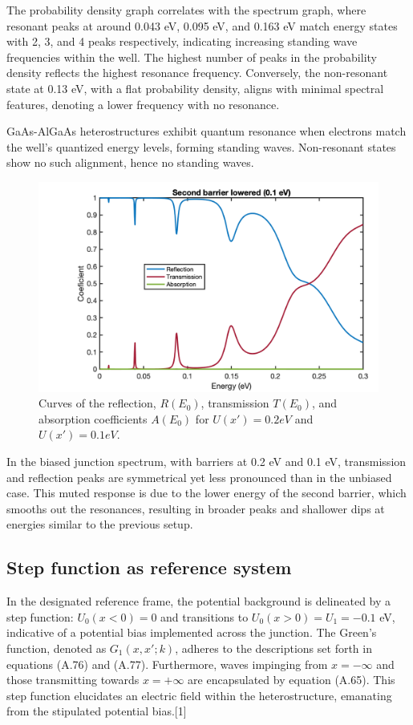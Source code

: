 \documentclass[twocolumn]{article}[ht]
\begin{document}
The probability density graph correlates with the spectrum graph, where resonant peaks at around 0.043 eV, 0.095 eV, and 0.163 eV match energy states with 2, 3, and 4 peaks respectively, indicating increasing standing wave frequencies within the well. The highest number of peaks in the probability density reflects the highest resonance frequency. Conversely, the non-resonant state at 0.13 eV, with a flat probability density, aligns with minimal spectral features, denoting a lower frequency with no resonance. 

GaAs-AlGaAs heterostructures exhibit quantum resonance when electrons match the well's quantized energy levels, forming standing waves. Non-resonant states show no such alignment, hence no standing waves.

\begin{figure}[ht]
    \centering
    \hspace{-1cm}
    \includegraphics[width=0.9\linewidth]{roughly_biased_junction_spectra.png}
    \caption{Curves of the reflection, $R(E_0)$, transmission $T(E_0)$, and absorption coefficients $A(E_0)$ for $U(x') = 0.2 eV$ and $U(x') = 0.1 eV$.}
    \label{fig:example-4}
\end{figure}
In the biased junction spectrum, with barriers at 0.2 eV and 0.1 eV, transmission and reflection peaks are symmetrical yet less pronounced than in the unbiased case. This muted response is due to the lower energy of the second barrier, which smooths out the resonances, resulting in broader peaks and shallower dips at energies similar to the previous setup.
\subsection{Step function as reference system}

In the designated reference frame, the potential background is delineated by a step function: \( U_0(x < 0) = 0 \) and transitions to \( U_0(x > 0) = U_1 = -0.1 \) eV, indicative of a potential bias implemented across the junction. The Green's function, denoted as \( G_1(x, x'; k) \), adheres to the descriptions set forth in equations (A.76) and (A.77). Furthermore, waves impinging from \( x = -\infty \) and those transmitting towards \( x = +\infty \) are encapsulated by equation (A.65). This step function elucidates an electric field within the heterostructure, emanating from the stipulated potential bias.[1]
\end{document}

